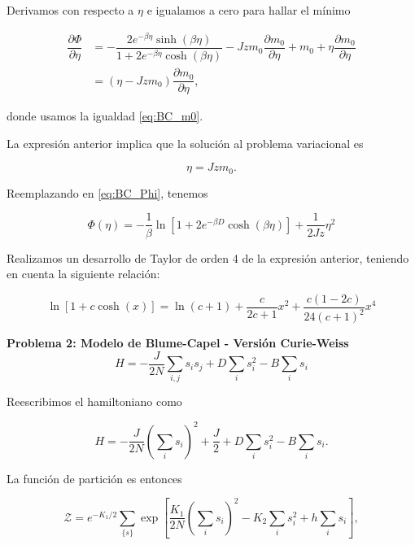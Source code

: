 \documentclass[10pt]{article}
\begin{document}
Derivamos con respecto a $\eta$ e igualamos a cero para hallar el m\'inimo

\begin{align}
\dfrac{\partial \Phi}{\partial \eta} &= -  \dfrac{2e^{-\beta \eta}\sinh\left( \beta \eta \right)}{1+2e^{-\beta \eta}\cosh\left( \beta \eta \right)} - Jzm_0 \dfrac{\partial m_0}{\partial \eta} + m_0 + \eta \dfrac{\partial m_0}{\partial \eta} \nonumber \\
&= \left(\eta - Jzm_0\right) \dfrac{\partial m_0}{\partial \eta},
\end{align}

donde usamos la igualdad \ref{eq:BC_m0}.

La expresi\'on anterior implica que la soluci\'on al problema variacional es 

\begin{equation}
\eta = Jzm_0.
\end{equation}

Reemplazando en \ref{eq:BC_Phi}, tenemos

\begin{equation}
\Phi(\eta) = -\dfrac{1}{\beta} \ln \left[ 1 + 2e^{-\beta D} \cosh\left(\beta \eta\right) \right]  + \dfrac{1}{2Jz} \eta^2
\end{equation}

Realizamos un desarrollo de Taylor de orden 4 de la expresi\'on anterior, teniendo en cuenta la siguiente relaci\'on:

\begin{equation}
\ln \left[ 1+ c \cosh(x) \right] = \ln(c+1) + \dfrac{c}{2c+1} x^2 + \dfrac{c(1-2c)}{24(c+1)^2} x^4
\end{equation}

\textbf{Problema 2: Modelo de Blume-Capel - Versi\'on Curie-Weiss}
\\


\begin{equation}
H = -\dfrac{J}{2N} \sum_{i,j} s_i s_j + D \sum_i s_i^2 - B\sum_i s_i
\end{equation}

Reescribimos el hamiltoniano como

\begin{equation}
H = -\dfrac{J}{2N} \left(\sum_i s_i \right)^2 + \dfrac{J}{2} + D \sum_i s_i^2 - B\sum_i s_i.
\end{equation}

La funci\'on de partici\'on es entonces 

\begin{equation}
\mathcal{Z} = e^{-K_1/2} \sum_{\lbrace s \rbrace} \exp \left[ \dfrac{K_1}{2N} \left(\sum_i s_i \right)^2 - K_2 \sum_i s_i^2 + h \sum_i s_i \right],
\end{equation}
\end{document}
